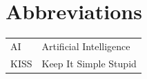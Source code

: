 \section*{Abbreviations}
\begin{longtable}[l]{l l}

AI & Artificial Intelligence \\
KISS & Keep It Simple Stupid\\

\end{longtable}